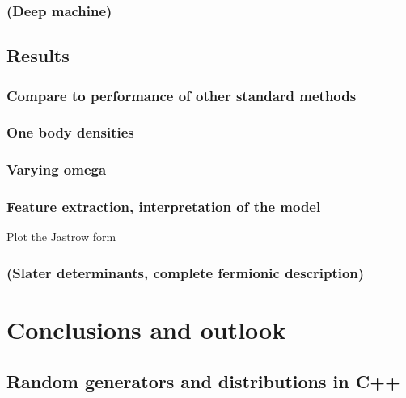 \documentclass[twoside,english]{uiofysmaster}
\begin{document}
\section{(Deep machine)}



\chapter{Results}
\section{Compare to performance of other standard methods}
\section{One body densities}
\section{Varying omega}
\section{Feature extraction, interpretation of the model}
Plot the Jastrow form
\section{(Slater determinants, complete fermionic description)}




\part{Conclusions and outlook}

\begin{appendices}
\chapter{Random generators and distributions in C++}
\end{appendices}

\newpage

\end{document}
